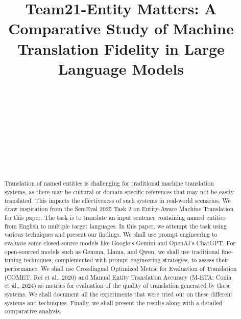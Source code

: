 \documentclass{ecai}
\begin{document}
\begin{frontmatter}

\title{Team21-Entity Matters: A Comparative Study of Machine Translation Fidelity in Large Language Models}

\author[A]{}
\author[A]{~}
\author[A]{~}
\author[A]{~}
\author[A]{~}
\author[A]{~}


\begin{abstract}
Translation of named entities is challenging for traditional machine translation systems, as there may be cultural or domain-specific references that may not be easily translated. This impacts the effectiveness of such systems in real-world scenarios. We draw inspiration from the SemEval 2025 Task 2 on Entity-Aware Machine Translation for this paper. The task is to translate an input sentence containing named entities from English to multiple target languages. In this paper, we attempt the task using various techniques and present our findings. We shall use prompt engineering to evaluate some closed-source models like Google's Gemini and OpenAI's ChatGPT. For open-sourced models such as Gemma, Llama, and Qwen, we shall use traditional fine-tuning techniques, complemented with prompt engineering strategies, to assess their performance. We shall use Crosslingual Optimized Metric for Evaluation of Translation (COMET; Rei et al., 2020) and Manual Entity Translation Accuracy (M-ETA; Conia et al., 2024) as metrics for evaluation of the quality of translation generated by these systems. We shall document all the experiments that were tried out on these different systems and techniques. Finally, we shall present the results along with a detailed comparative analysis.
\end{abstract}
\end{frontmatter}
\end{document}
